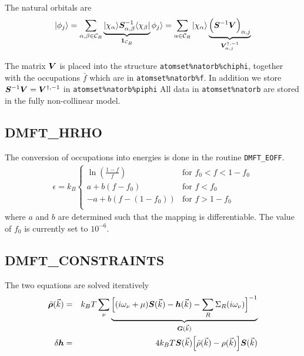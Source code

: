 \documentclass[11pt,a4paper]{report}
\begin{document}
The natural orbitals are
\begin{eqnarray}
|\phi_j\rangle=\sum_{\alpha,\beta\in\mathcal{C}_R}
\underbrace{|\chi_\alpha\rangle
\bm{S}^{-1}_{\alpha,\beta}\langle\chi_\beta|}_{\bm{1}_{\mathcal{C}_R}}
\phi_j\rangle
=\sum_{\alpha\in\mathcal{C}_R}|\chi_\alpha\rangle
\underbrace{\Bigl(\bm{S}^{-1}\bm{V}\Bigr)_{\alpha,j}}_{\bm{V}^{\dagger,-1}_{\alpha,j}}
\end{eqnarray}

The matrix $\bm{V}$ is placed into the structure
\verb|atomset%natorb%chiphi|, together with the occupations $\bar{f}$
which are in \verb|atomset%natorb%f|. In addition we store
$\bm{S}^{-1}\bm{V}=\bm{V}^{\dagger,-1}$ in
\verb|atomset%natorb%piphi| All data in \verb|atomset%natorb| are
stored in the fully non-collinear model.

\subsection{DMFT\_HRHO}
The conversion of occupations into energies is done in the routine
\verb|DMFT_EOFF|.
\begin{eqnarray}
\epsilon=k_B
\begin{cases}
\ln\left(\frac{1-f}{f}\right) &\text{for $f_0<f<1-f_0$}\\
a+b(f-f_0)&\text{for $f<f_0$}\\
-a+b(f-(1-f_0))&\text{for $f>1-f_0$}\\
\end{cases}
\end{eqnarray}
where $a$ and $b$ are determined such that the mapping is
differentiable. The value of $f_0$ is currently set to $10^{-6}$.

\subsection{DMFT\_CONSTRAINTS}
The two equations are solved iteratively
\begin{eqnarray}
\bar{\bm{\rho}}(\vec{k})&=&k_BT\sum_\nu
\underbrace{\Bigl[
(i\omega_\nu+\mu)\bm{S}(\vec{k})-\bm{h}(\vec{k})-\sum_R \Sigma_R(i\omega_\nu)
\Bigr]^{-1}}_{\bm{G}(\vec{k})}
\\
\delta\bm{h}&=&4k_BT\bm{S}(\vec{k})\Bigl[
\bar{\rho}(\vec{k})-\rho(\vec{k})\Bigr]
\bm{S}(\vec{k})
\end{eqnarray}
\end{document}
